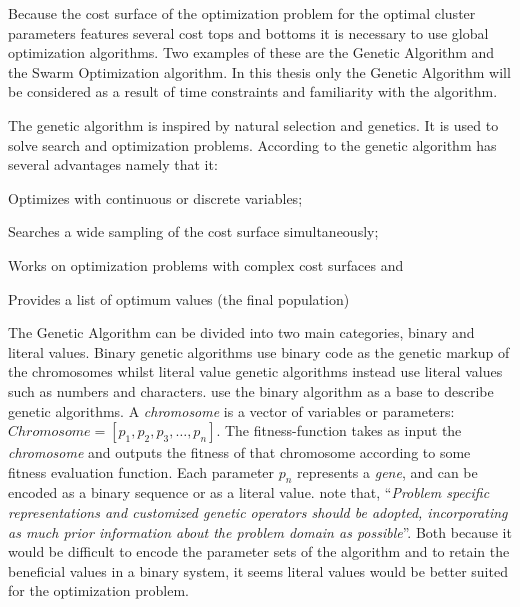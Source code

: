 Because the cost surface of the optimization problem for the optimal \CTC cluster parameters features several cost tops and bottoms it is necessary to use global optimization algorithms. Two examples of these are the Genetic Algorithm and the Swarm Optimization algorithm. In this thesis only the Genetic Algorithm will be considered as a result of time constraints and familiarity with the algorithm.

The genetic algorithm is inspired by natural selection and genetics. It is used to solve search and optimization problems. According to \citeauthor[23]{Haupt2004} the genetic algorithm has several advantages namely that it:
\begin{inparaenum}[\itshape 1\upshape)]
\item Optimizes with continuous or discrete variables;
\item Searches a wide sampling of the cost surface simultaneously;
\item Works on optimization problems with complex cost surfaces and
\item Provides a list of optimum values (the final population) 
\end{inparaenum}

The Genetic Algorithm can be divided into two main categories, binary and literal values. Binary genetic algorithms use binary code as the genetic markup of the chromosomes whilst literal value genetic algorithms instead use literal values such as numbers and characters. \citeauthor{Haupt2004a} use the binary algorithm as a base to describe genetic algorithms. A \textit{chromosome} is a vector of variables or parameters: \(Chromosome = [p_{1},p_{2},p_{3},\dots,p_{n}]\). The fitness-function takes as input the \textit{chromosome} and outputs the fitness of that chromosome according to some fitness evaluation function. Each parameter \(p_{n}\) represents a \textit{gene}, and can be encoded as a binary sequence or as a literal value. \citeauthor[p. 93]{Brownlee2011} note that, ``\textit{Problem specific representations and customized genetic operators should be adopted, incorporating as much prior information about the problem domain as possible}''. Both because it would be difficult to encode the parameter sets of the \CTC algorithm and to retain the beneficial values in a binary system, it seems literal values would be better suited for the optimization problem.

